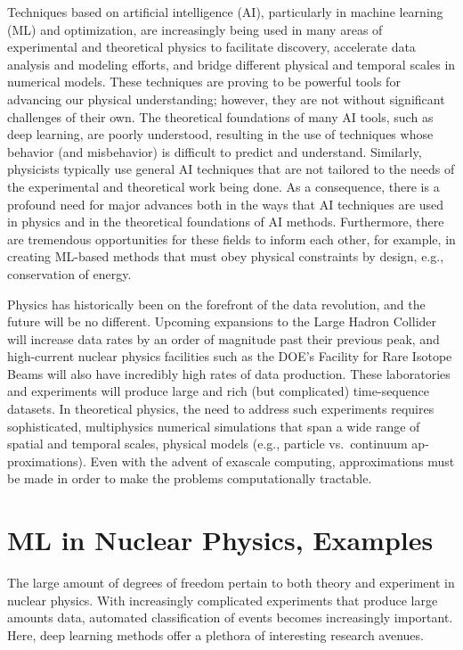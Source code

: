 \documentclass[%
oneside,                 %
final,                   %
10pt]{article}
\begin{document}
Techniques based on artificial intelligence (AI), particularly in
machine learning (ML) and optimization, are increasingly being used in
many areas of experimental and theoretical physics to facilitate
discovery, accelerate data analysis and modeling efforts, and bridge
different physical and temporal scales in numerical models. These 
techniques are proving to be powerful tools for advancing our physical
understanding; however, they are not without significant challenges
of their own. The theoretical foundations of many AI tools, such as
deep learning, are poorly understood, resulting in the use of
techniques whose behavior (and misbehavior) is difficult to predict
and understand. Similarly, physicists typically use general AI
techniques that are not tailored to the needs of the experimental and
theoretical work being done. As a consequence, there is a profound
need for major advances both in the ways that AI techniques are used
in physics and in the theoretical foundations of AI
methods. Furthermore, there are tremendous opportunities for these
fields to inform each other, for example, in creating ML-based
methods that must obey physical constraints by design, e.g.,
conservation of energy.



Physics has historically been on the forefront of the data revolution,
and the future will be no different. Upcoming expansions to the
Large Hadron Collider will increase data rates by an order of
magnitude past their previous peak, and high-current nuclear physics
facilities such as the DOE’s Facility for Rare Isotope Beams will also
have incredibly high rates of data production. These laboratories and experiments
will produce large and rich (but
complicated) time-sequence datasets. In theoretical physics, the need
to address such experiments requires sophisticated, multiphysics
numerical simulations that span a wide range of spatial and temporal
scales, physical models (e.g., particle vs.~continuum ap-
proximations). Even with the advent of exascale
computing, approximations must be made in order to make the problems
computationally tractable.


\section{ML in Nuclear Physics, Examples}

The large amount of degrees of freedom pertain to both theory and experiment in nuclear physics. With increasingly complicated experiments that produce large amounts data, automated classification of events becomes increasingly important. Here, deep learning methods offer a plethora of interesting research avenues. 
\end{document}
